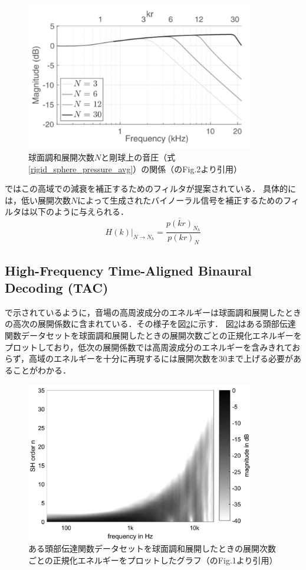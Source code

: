 \documentclass[a4paper]{jsarticle}
\begin{document}
\begin{figure}[htbp]
    \centering
    \includegraphics[clip,width=10cm]{./high_freq_rolloff.png}
    \caption{球面調和展開次数$N$と剛球上の音圧（式\ref{rigid_sphere_pressure_avg}）の関係（\cite{Ben-Hur2017-gm}のFig.2より引用）}
    \label{high_freq_rolloff}
\end{figure}

\cite{Sheaffer2014-bo}ではこの高域での減衰を補正するためのフィルタが提案されている．
具体的には，低い展開次数$N$によって生成されたバイノーラル信号を補正するためのフィルタは以下のように与えられる．
$$
    \left.H(k)\right|_{N \rightarrow N_{h}}=\frac{\overline{p(k r)}_{N_{h}}}{p(k r)_{N}}
$$

\subsection{High-Frequency Time-Aligned Binaural Decoding
    (TAC)\cite{Schorkhuber2018-ql,Zaunschirm2018-mn}}
\cite{Zaunschirm2018-mn}で示されているように，音場の高周波成分のエネルギーは球面調和展開したときの高次の展開係数に含まれている．その様子を図\ref{high_order_energy}に示す．
図\ref{high_order_energy}はある頭部伝達関数データセットを球面調和展開したときの展開次数ごとの正規化エネルギーをプロットしており，低次の展開係数では高周波成分のエネルギーを含みきれておらず，高域のエネルギーを十分に再現するには展開次数を30まで上げる必要があることがわかる．

\begin{figure}[htbp]
    \centering
    \includegraphics[clip,width=10cm]{./high_order_energy.png}
    \caption{ある頭部伝達関数データセットを球面調和展開したときの展開次数ごとの正規化エネルギーをプロットしたグラフ（\cite{Zaunschirm2018-mn}のFig.1より引用）}
    \label{high_order_energy}
\end{figure}
\end{document}
